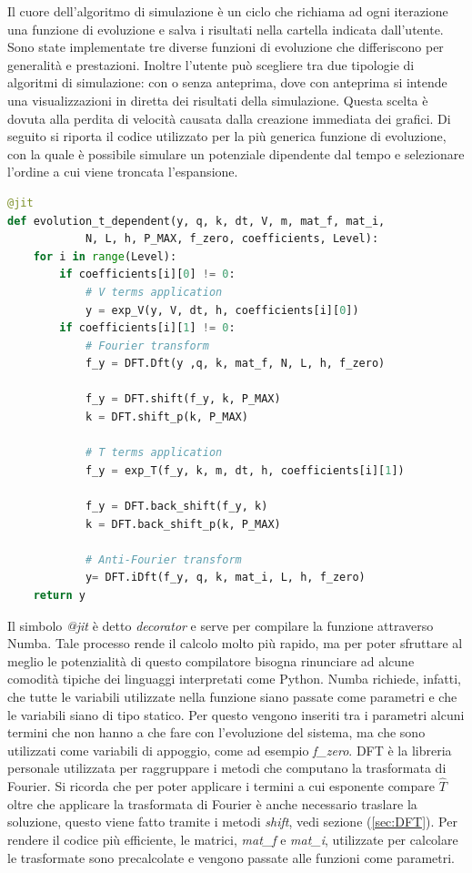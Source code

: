 Il cuore dell'algoritmo di simulazione è un ciclo che richiama ad ogni iterazione una funzione di evoluzione e salva i risultati nella cartella indicata dall'utente.
Sono state implementate tre diverse funzioni di evoluzione che differiscono per generalità e prestazioni. Inoltre l'utente può scegliere tra due tipologie di algoritmi di simulazione: con o senza anteprima, dove con anteprima si intende una visualizzazioni in diretta dei risultati della simulazione. Questa scelta è dovuta alla perdita di velocità causata dalla creazione immediata dei grafici.
Di seguito si riporta il codice utilizzato per la più generica funzione di evoluzione, con la quale è possibile simulare un potenziale dipendente dal tempo e selezionare l'ordine a cui viene troncata l'espansione.
\begin{lstlisting}[language = Python]
@jit
def evolution_t_dependent(y, q, k, dt, V, m, mat_f, mat_i, 
            N, L, h, P_MAX, f_zero, coefficients, Level):
    for i in range(Level):
        if coefficients[i][0] != 0:
            # V terms application
            y = exp_V(y, V, dt, h, coefficients[i][0])
        if coefficients[i][1] != 0:
            # Fourier transform 
            f_y = DFT.Dft(y ,q, k, mat_f, N, L, h, f_zero)   

            f_y = DFT.shift(f_y, k, P_MAX)
            k = DFT.shift_p(k, P_MAX)

            # T terms application
            f_y = exp_T(f_y, k, m, dt, h, coefficients[i][1])      

            f_y = DFT.back_shift(f_y, k)
            k = DFT.back_shift_p(k, P_MAX)

            # Anti-Fourier transform
            y= DFT.iDft(f_y, q, k, mat_i, L, h, f_zero)   
    return y
\end{lstlisting}
Il simbolo \textsl{@jit} è detto \textsl{decorator} e serve per compilare la funzione attraverso Numba. Tale processo rende il calcolo molto più rapido, ma per poter sfruttare al meglio le potenzialità di questo compilatore bisogna rinunciare ad alcune comodità tipiche dei linguaggi interpretati come Python. Numba richiede, infatti, che tutte le variabili utilizzate nella funzione siano passate come parametri e che le variabili siano di tipo statico. Per questo vengono inseriti tra i parametri alcuni termini che non hanno a che fare con l'evoluzione del sistema, ma che sono utilizzati come variabili di appoggio, come ad esempio \textsl{f\_zero}.
DFT è la libreria personale utilizzata per raggruppare i metodi che computano la trasformata di Fourier. Si ricorda che per poter applicare i termini a cui esponente compare $\hat{T}$ oltre che applicare la trasformata di Fourier è anche necessario traslare la soluzione, questo viene fatto tramite i metodi \textsl{shift}, vedi sezione (\ref{sec:DFT}). Per rendere il codice più efficiente, le matrici, \textsl{mat\_f} e \textsl{mat\_i}, utilizzate per calcolare le trasformate sono precalcolate e vengono passate alle funzioni come parametri.
